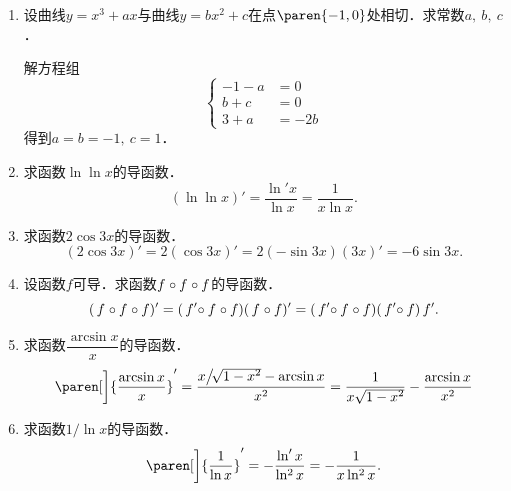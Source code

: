 \begin{enumerate}
\item 设曲线\(y = x^3 + ax\)与曲线\(y = bx^2 + c\)在点\(\paren{-1,0}\)处相切．求常数\(a,\ b,\ c\)．

  \ifshowsol
  解方程组
  \begin{equation*}
    \left\{
      \begin{aligned}
        -1 - a &= 0 \\
        b + c &= 0 \\
        3 + a &= -2b
      \end{aligned}
    \right.
  \end{equation*}
  得到\(a = b = -1,\ c = 1\)．
  \fi

\item 求函数\(\ln\ln x\)的导函数．
  \ifshowsol
  \begin{equation*}
    (\ln\ln x)'
    = \frac{\ln' x}{\ln x}
    = \frac{1}{x \ln x}.
  \end{equation*}
  \fi

\item 求函数\(2\cos3x\)的导函数．
  \ifshowsol
  \begin{equation*}
    (2\cos3x)' = 2(\cos3x)' = 2(-\sin3x)(3x)' = -6\sin3x.
  \end{equation*}
  \fi

\item 设函数\(f\)可导．求函数\(f\mkern1mu \circ f\mkern1mu \circ f\)的导函数．
  \ifshowsol
  \begin{equation*}
    (\,f\mkern1mu \circ f\mkern1mu \circ f)'
    = (\,f'\mkern-4mu \circ f\mkern1mu \circ f) (\,f\mkern1mu \circ f)'
    = (\,f'\mkern-4mu \circ f\mkern1mu \circ f) (\,f'\mkern-4mu \circ f) \,f'.
  \end{equation*}
  \fi

\item 求函数\(\dfrac{\arcsin x}{x}\)的导函数．
  \ifshowsol
  \begin{equation*}
    \paren[\bigg]{\frac{\arcsin x}{x}}'
    = \frac{x\big/\!\sqrt{1-\smash{x^2}} - \arcsin x}{x^2}
    = \frac{1}{x \sqrt{1-\smash{x^2}}} - \frac{\arcsin x}{x^2}
  \end{equation*}
  \fi

\item 求函数\(1/\!\ln x\)的导函数．
  \ifshowsol
  \begin{equation*}
    \paren[\bigg]{\frac1{\ln x}}'
    = - \frac{\ln'x}{\operatorname{ln^2} x}
    = - \frac{1}{x \operatorname{ln^2} x}.
  \end{equation*}
  \fi


\end{enumerate}

